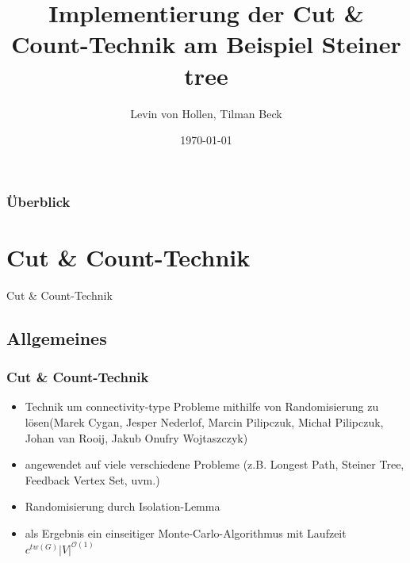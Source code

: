 \documentclass{beamer}
\title[Cut \& Count]{Implementierung der Cut \& Count-Technik am Beispiel Steiner tree} %
\author{
Levin von Hollen, 
Tilman Beck
}
\institute[] %
{
\textit{ \{stu127560-, stu127568-\}@informatik.uni-kiel.de} \\
\medskip
Christian-Albrechts Universität Kiel  %
}
\date{\today} %
\begin{document}
\begin{frame}
\titlepage %
\end{frame}

\begin{frame}
\frametitle{Überblick} %
\tableofcontents %
\end{frame}

\section{Cut \& Count-Technik} %

\begin{frame}
\Huge{\centerline{Cut \& Count-Technik}}
\end{frame}


\subsection{Allgemeines}
\begin{frame}
\frametitle{Cut \& Count-Technik}
\begin{itemize}
\item Technik um connectivity-type Probleme mithilfe von Randomisierung zu lösen(Marek Cygan, Jesper Nederlof, Marcin Pilipczuk, Michał Pilipczuk, Johan van Rooij, Jakub Onufry Wojtaszczyk)
\item angewendet auf viele verschiedene Probleme (z.B. Longest Path, Steiner Tree, Feedback Vertex Set, uvm.)
\item Randomisierung durch Isolation-Lemma 
\item als Ergebnis ein einseitiger Monte-Carlo-Algorithmus mit Laufzeit $c^{tw(G)} |V|^{\mathcal{O}(1)}$
\end{itemize}
\end{frame}
\end{document}
